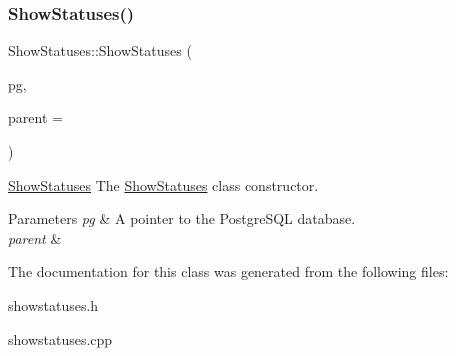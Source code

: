 \subsubsection{\texorpdfstring{Show\+Statuses()}{ShowStatuses()}}
{\footnotesize\ttfamily Show\+Statuses\+::\+Show\+Statuses (\begin{DoxyParamCaption}\item[{\hyperlink{classpsql}{psql} $\ast$}]{pg,  }\item[{Q\+Widget $\ast$}]{parent = {} }\end{DoxyParamCaption})\hspace{0.3cm}{\ttfamily [explicit]}}



\hyperlink{class_show_statuses}{Show\+Statuses} The \hyperlink{class_show_statuses}{Show\+Statuses} class constructor. 


\begin{DoxyParams}{Parameters}
{\em pg} & A pointer to the Postgre\+S\+QL database. \\
\hline
{\em parent} & \\
\hline
\end{DoxyParams}


The documentation for this class was generated from the following files\+:\begin{DoxyCompactItemize}
\item 
showstatuses.\+h\item 
showstatuses.\+cpp\end{DoxyCompactItemize}
